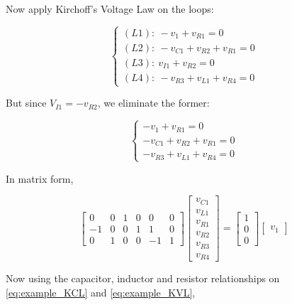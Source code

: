 \begin{example}
	Now apply Kirchoff's Voltage Law on the loops:

\begin{equation} %
	\left\{\begin{array}{l}
		(L1):\ -v_1 + v_{R1} = 0 \\[3mm]
		(L2):\ -v_{C1} + v_{R2} + v_{R1} = 0 \\[3mm]
		(L3):\ v_{I1} + v_{R2} = 0 \\[3mm]
		(L4):\ -v_{R3} + v_{L1} + v_{R4} = 0 
	\end{array}\right.
\end{equation} %

	But since $V_{I1} = -v_{R2}$, we eliminate the former:

\begin{equation} %
	\left\{\begin{array}{l}
		-v_1 + v_{R1} = 0 \\[3mm]
		-v_{C1} + v_{R2} + v_{R1} = 0 \\[3mm]
		-v_{R3} + v_{L1} + v_{R4} = 0 
	\end{array}\right.
\end{equation} %

	In matrix form,

\begin{equation} %
%
	\left[\begin{array}{ccccccc}
	 0 &  0 &  1 & 0 & 0 & 0 \\[3mm]
	-1 &  0 &  0 & 1 & 1 & 0 \\[3mm]
	 0 &  1 &  0 & 0 &-1 & 1 
	\end{array}\right]
%
	\left[\begin{array}{c}
		v_{C1} \\[3mm] v_{L1} \\[3mm] v_{R1} \\[3mm] v_{R2} \\[3mm] v_{R3} \\[3mm] v_{R4}
	\end{array}\right] =
%
	\left[\begin{array}{c}
		1 \\[3mm] 0 \\[3mm] 0
	\end{array}\right]
%
	\left[\begin{array}{c}
		v_1
	\end{array}\right]\label{eq:example_KVL}
\end{equation} %

	Now using the capacitor, inductor and resistor relationships on \eqref{eq:example_KCL} and \eqref{eq:example_KVL},


\end{example}
